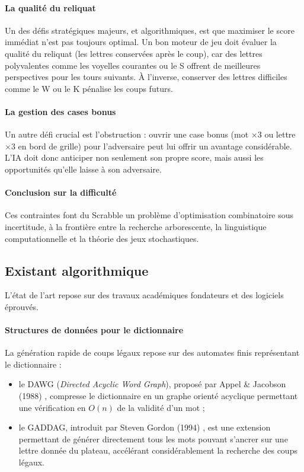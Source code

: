 \documentclass[a4paper]{article}
\begin{document}
    \paragraph{La qualité du reliquat}
    Un des défis stratégiques majeurs, et algorithmiques, est que maximiser le score immédiat n'est pas toujours optimal. Un bon moteur de jeu doit évaluer la qualité du reliquat (les lettres conservées après le coup), car des lettres polyvalentes comme les voyelles courantes ou le S offrent de meilleures perspectives pour les tours suivants. À l'inverse, conserver des lettres difficiles comme le W ou le K pénalise les coups futurs.

    \paragraph{La gestion des cases bonus}
    Un autre défi crucial est l'obstruction : ouvrir une case bonus (mot $\times 3$ ou lettre $\times 3$ en bord de grille) pour l'adversaire peut lui offrir un avantage considérable. L'IA doit donc anticiper non seulement son propre score, mais aussi les opportunités qu'elle laisse à son adversaire.

    \paragraph{Conclusion sur la difficulté}
    Ces contraintes font du Scrabble un problème d'optimisation combinatoire sous incertitude, à la frontière entre la recherche arborescente, la linguistique computationnelle et la théorie des jeux stochastiques.

    \newpage
    \subsection{Existant algorithmique}
    L'état de l'art repose sur des travaux académiques fondateurs et des logiciels éprouvés.

    \paragraph{Structures de données pour le dictionnaire}
    La génération rapide de coups légaux repose sur des automates finis représentant le dictionnaire :
	\begin{itemize}
        \item le DAWG (\textit{Directed Acyclic Word Graph}), proposé par Appel \& Jacobson (1988) \cite{10.1145/42411.42420}, compresse le dictionnaire en un graphe orienté acyclique permettant une vérification en $O(n)$ de la validité d'un mot ;
        \item le GADDAG, introduit par Steven Gordon (1994) \cite{10.1002/spe.4380240205}, est une extension permettant de générer directement tous les mots pouvant s'ancrer sur une lettre donnée du plateau, accélérant considérablement la recherche des coups légaux.
	\end{itemize}
\end{document}
